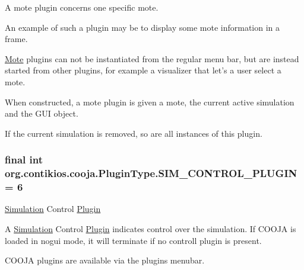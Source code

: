A mote plugin concerns one specific mote.

An example of such a plugin may be to display some mote information in a frame.

\hyperlink{interfaceorg_1_1contikios_1_1cooja_1_1Mote}{Mote} plugins can not be instantiated from the regular menu bar, but are instead started from other plugins, for example a visualizer that let's a user select a mote.

When constructed, a mote plugin is given a mote, the current active simulation and the G\-U\-I object.

If the current simulation is removed, so are all instances of this plugin. \hypertarget{interfaceorg_1_1contikios_1_1cooja_1_1PluginType_ae155ed8fa9ace82527925b010b33813e}{
\subsubsection[{S\-I\-M\-\_\-\-C\-O\-N\-T\-R\-O\-L\-\_\-\-P\-L\-U\-G\-I\-N}]{\setlength{\rightskip}{0pt plus 5cm}final int org.\-contikios.\-cooja.\-Plugin\-Type.\-S\-I\-M\-\_\-\-C\-O\-N\-T\-R\-O\-L\-\_\-\-P\-L\-U\-G\-I\-N = 6\hspace{0.3cm}{\ttfamily [static]}}}\label{interfaceorg_1_1contikios_1_1cooja_1_1PluginType_ae155ed8fa9ace82527925b010b33813e}
\hyperlink{classorg_1_1contikios_1_1cooja_1_1Simulation}{Simulation} Control \hyperlink{interfaceorg_1_1contikios_1_1cooja_1_1Plugin}{Plugin}

A \hyperlink{classorg_1_1contikios_1_1cooja_1_1Simulation}{Simulation} Control \hyperlink{interfaceorg_1_1contikios_1_1cooja_1_1Plugin}{Plugin} indicates control over the simulation. If C\-O\-O\-J\-A is loaded in nogui mode, it will terminate if no controll plugin is present.

C\-O\-O\-J\-A plugins are available via the plugins menubar.

